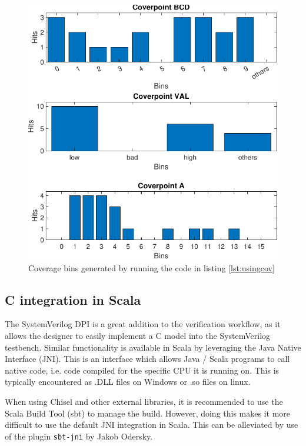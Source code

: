 \documentclass[conference]{IEEEtran}
\newcommand{\SV}{SystemVerilog\xspace}
\begin{document}
\begin{figure}[htbp]
	\centering
	\includegraphics[width=\columnwidth]{coverage.pdf}
	\caption{Coverage bins generated by running the code in listing \ref{lst:usingcov}}
\label{fig:coverage}
\end{figure}

\subsection{C integration in Scala}
The \SV DPI is a great addition to the verification workflow, as it allows the designer to easily implement a C model into the \SV testbench.
Similar functionality is available in Scala by leveraging the Java Native Interface (JNI). This is an interface which allows Java / Scala programs to call native code, i.e. code compiled for the specific CPU it is running on. This is typically encountered as .DLL files on Windows or .so files on linux.

When using Chisel and other external libraries, it is recommended to use the Scala Build Tool (sbt) to manage the build. However, doing this makes it more difficult to use the default JNI integration in Scala. This can be alleviated by use of the plugin \texttt{sbt-jni} by Jakob Odersky. 
\end{document}
